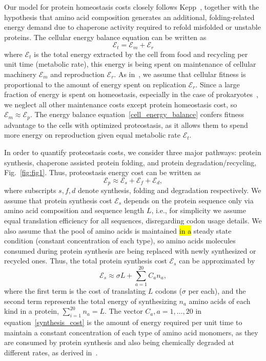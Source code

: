 \documentclass[10pt,letterpaper]{article}
\begin{document}
Our model for protein homeostasis costs closely follows Kepp~\cite{Kepp2014Model}, together with the hypothesis that amino acid composition generates an additional, folding-related energy demand due to chaperone activity required to refold misfolded or unstable proteins. The cellular energy balance equation can be written as
\begin{equation}
	\label{cell_energy_balance}
	\mathcal{E}_{t} = \mathcal{E}_{m} + \mathcal{E}_{r}
\end{equation}
where $\mathcal{E}_{t}$ is the total energy extracted by the cell from food and recycling per unit time (metabolic rate), this energy is being spent on maintenance of cellular machinery $\mathcal{E}_{m}$ and reproduction $\mathcal{E}_{r}$. As in~\cite{Kepp2014Model}, we assume that cellular fitness is proportional to the amount of energy spent on replication $\mathcal{E}_{r}$.  Since a large fraction of energy is spent on homeostasis, especially in the case of prokaryotes~\cite{Harold1987Vital}, we neglect all other maintenance costs except protein homeostasis cost, so $\mathcal{E}_{m}\approx\mathcal{E}_{p}$.
The energy balance equation~\eqref{cell_energy_balance} confers fitness advantage to the cells with optimized proteostasis, as it allows them to spend more energy on reproduction given equal metabolic rate $\mathcal{E}_{t}$. 

In order to quantify proteostasis costs, we consider three major pathways: protein synthesis, chaperone assisted protein folding, and protein degradation/recycling,  Fig.~\ref{fig:fig1}. Thus, proteostasis energy cost can be written as
\begin{equation}
	\label{proteostasis_cost_expansion}
	\mathcal{E}_{p} \approx \mathcal{E}_{s} + \mathcal{E}_{f} + \mathcal{E}_{d},
\end{equation}
where subscripts $s,f,d$ denote synthesis, folding and degradation respectively. We assume that protein synthesis cost $\mathcal{E}_{s}$ depends on the protein sequence only via amino acid composition and sequence length $L$, i.e., for simplicity we assume equal translation efficiency for all sequences, disregarding codon usage details. We also assume that the pool of amino acids is maintained \hl{in a} steady state condition (constant concentration of each type), so amino acids molecules consumed during protein synthesis are being replaced with newly synthesized or recycled ones. Thus, the total protein synthesis cost $\mathcal{E}_{s}$ can be approximated by
\begin{equation}
	\label{synthesis_cost}
	\mathcal{E}_{s} \approx \sigma L + \sum\limits_{a=1}^{20}C_{a}n_{a},
\end{equation}
where the first term is the cost of translating $L$ codons ($\sigma$ per each), and the second term represents the total energy of synthesizing $n_{a}$ amino acids of each kind in a protein, $\sum\limits_{i=1}^{20}n_{a} = L$. The vector $C_{a}, a=1,\dots,20$ in equation~\eqref{synthesis_cost} is the amount of energy required per unit time to maintain a constant concentration of each type of amino acid monomers, as they are consumed by protein synthesis and also being chemically degraded at different rates, as derived in~\cite{Krick2014Amino}. 
 
\end{document}
